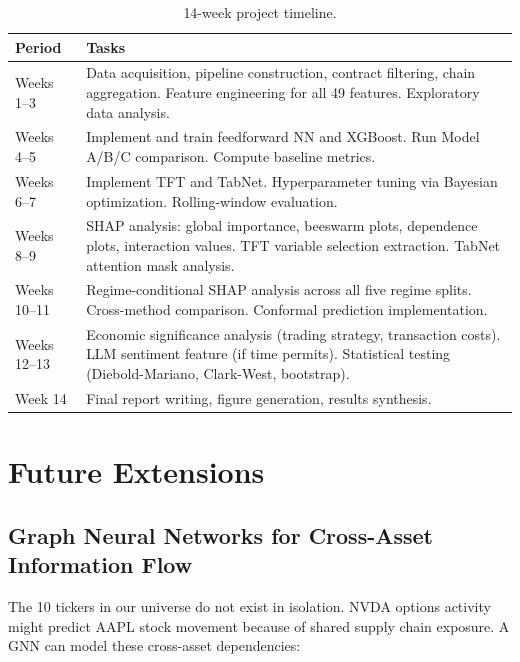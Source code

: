 \documentclass[11pt,a4paper]{article}
\begin{document}
\begin{table}[H]
\centering
\begin{tabularx}{\textwidth}{@{}lX@{}}
\toprule
\textbf{Period} & \textbf{Tasks} \\
\midrule
Weeks 1--3 & Data acquisition, pipeline construction, contract filtering, chain aggregation. Feature engineering for all 49 features. Exploratory data analysis. \\
\addlinespace
Weeks 4--5 & Implement and train feedforward NN and XGBoost. Run Model A/B/C comparison. Compute baseline metrics. \\
\addlinespace
Weeks 6--7 & Implement TFT and TabNet. Hyperparameter tuning via Bayesian optimization. Rolling-window evaluation. \\
\addlinespace
Weeks 8--9 & SHAP analysis: global importance, beeswarm plots, dependence plots, interaction values. TFT variable selection extraction. TabNet attention mask analysis. \\
\addlinespace
Weeks 10--11 & Regime-conditional SHAP analysis across all five regime splits. Cross-method comparison. Conformal prediction implementation. \\
\addlinespace
Weeks 12--13 & Economic significance analysis (trading strategy, transaction costs). LLM sentiment feature (if time permits). Statistical testing (Diebold-Mariano, Clark-West, bootstrap). \\
\addlinespace
Week 14 & Final report writing, figure generation, results synthesis. \\
\bottomrule
\end{tabularx}
\caption{14-week project timeline.}
\end{table}


\section{Future Extensions}

\subsection{Graph Neural Networks for Cross-Asset Information Flow}

The 10 tickers in our universe do not exist in isolation. NVDA options activity might predict AAPL stock movement because of shared supply chain exposure. A GNN can model these cross-asset dependencies:
\end{document}
